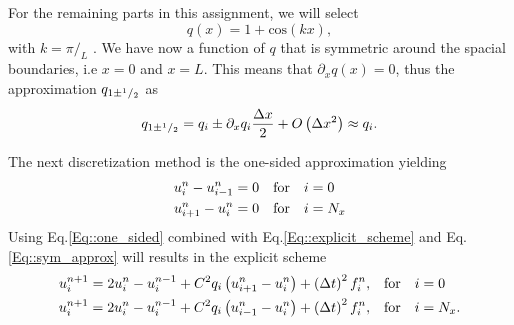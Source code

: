 \documentclass[11pt]{article}
\begin{document}
For the remaining parts in this assignment, we will select 
\begin{equation}
q\left( x \right) = 1 + \text{cos}\left(k x \right) ,
\end{equation}
with $k= \pi/_{L}$ . We have now a function of $q$ that is symmetric around the spacial  boundaries, i.e  $x=0$ and $x=L$. This means that $\partial_x q(x) = 0$, thus the approximation $q_{1\pm\sp{1}/_2}$ as
\begin{equation}
q_{1\pm\sp{1}/_2} =  q_i \pm \partial_x q_i\frac{\Delta x}{2} + O\left( \Delta x\sp{2}\right) \approx q_i .
\label{Eq::sym_approx}
\end{equation}

The next discretization method is the one-sided approximation yielding 
\begin{equation}
\begin{aligned}
  u\sp{n}_{i} -  u\sp{n}_{i-1} = 0 &\quad \text{for} \quad i = 0\\
  u\sp{n}_{i+1} -  u\sp{n}_{i} = 0 &\quad \text{for} \quad i = N_x
\end{aligned}
\label{Eq::one_sided}
\end{equation}
Using Eq.\ref{Eq::one_sided} combined with Eq.\ref{Eq::explicit_scheme} and Eq.\ref{Eq::sym_approx} will results in the explicit scheme 
\begin{equation}
\begin{aligned}
u\sp{n+1}_i  =  2u\sp{n}_i-u\sp{n-1}_i +  C\sp{2}  q_{i} \left( u\sp{n}_{i+1} -u\sp{n}_{i} \right) +  \left(\Delta t\right)\sp{2}f\sp{n}_i , &\quad \text{for} \quad i = 0 \\
u\sp{n+1}_i  =  2u\sp{n}_i-u\sp{n-1}_i +C\sp{2}q_{i} \left( u\sp{n}_{i-1} -u\sp{n}_{i} \right)  +  \left(\Delta t\right)\sp{2}f\sp{n}_i , &\quad \text{for} \quad i = N_x .
\end{aligned}
\end{equation}
\end{document}
